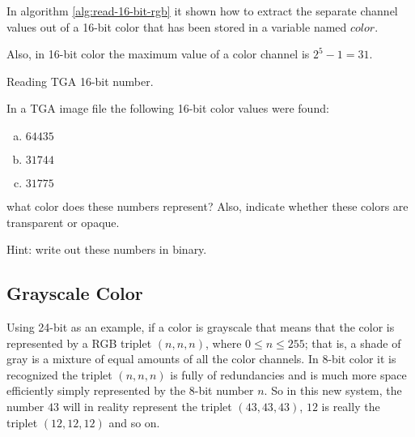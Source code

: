 In algorithm \ref{alg:read-16-bit-rgb} it shown how to extract the
separate channel values out of a 16-bit color that has been stored in
a variable named $color$.

Also, in 16-bit color the maximum value of a color channel is $2^5 - 1
= 31$.

\begin{algorithm}[H]
  \caption{Reading TGA 16-bit number.}
  \label{alg:read-16-bit-rgb}
  \begin{algorithmic}[1]
  \end{algorithmic}
\end{algorithm}

\begin{Exercise}[label={tga-16-bit}]

  In a TGA image file the following 16-bit color values were found:

  \begin{enumerate}[(a)]
  \item $64435$
  \item $31744$
  \item $31775$
  \end{enumerate}

  what color does these numbers represent? Also, indicate whether
  these colors are transparent or opaque.

  Hint: write out these numbers in binary.

\end{Exercise}


\subsection{Grayscale Color}


\newcommand{\selfrgbtrip}[3]{\mbox{\textcolor[RGB]{#1,#2,#3}{(#1,#2,#3)}}}
\newcommand{\selfrgbtripgray}[1]{\selfrgbtrip{#1}{#1}{#1}}

Using 24-bit as an example, if a color is grayscale that means that
the color is represented by a RGB triplet $(n,n,n)$, where $0 \le n
\le 255$; that is, a shade of gray is a mixture of equal amounts of
all the color channels. In 8-bit color it is recognized the triplet
$(n,n,n)$ is fully of redundancies and is much more space efficiently
simply represented by the 8-bit number $n$. So in this new system, the
number $43$ will in reality represent the triplet $(43,43,43)$, $12$
is really the triplet $(12,12,12)$ and so on.

